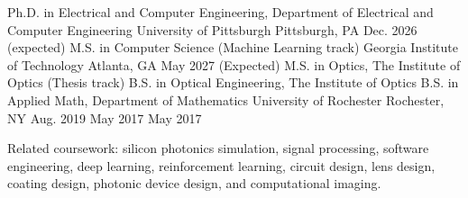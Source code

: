 

\begin{cventries}
  \cventry
    {Ph.D. in Electrical and Computer Engineering, Department of Electrical and Computer Engineering} %
    {University of Pittsburgh} %
    {Pittsburgh, PA} %
    {Dec. 2026 (expected)} %
    {
    }
\vspace{-0.4cm}
  \cventry
    {M.S. in Computer Science (Machine Learning track)} %
    {Georgia Institute of Technology} %
    {Atlanta, GA} %
    {May 2027 (Expected)} %
    {
    }
\vspace{-0.4cm}
  \cventry
    {M.S. in Optics, The Institute of Optics (Thesis track)  \linebreak B.S. in Optical Engineering, The Institute of Optics \linebreak B.S. in Applied Math, Department of Mathematics} %
    {University of Rochester } %
    {Rochester, NY} %
    {Aug. 2019 \linebreak May 2017 \linebreak May 2017} %
    {
    \begin{cvitems} 
        \item {Related coursework: silicon photonics simulation, signal processing, software engineering, deep learning, reinforcement learning, circuit design, lens design, coating design, photonic device design, and computational imaging.}
    \end{cvitems}
    }
\vspace{-0.5cm}
\end{cventries}
